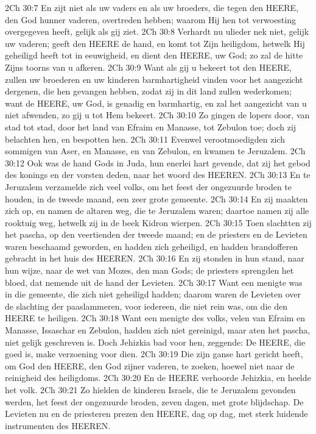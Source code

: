 2Ch 30:7  En zijt niet als uw vaders en als uw broeders, die tegen den HEERE, den God hunner vaderen, overtreden hebben; waarom Hij hen tot verwoesting overgegeven heeft, gelijk als gij ziet.
2Ch 30:8  Verhardt nu ulieder nek niet, gelijk uw vaderen; geeft den HEERE de hand, en komt tot Zijn heiligdom, hetwelk Hij geheiligd heeft tot in eeuwigheid, en dient den HEERE, uw God; zo zal de hitte Zijns toorns van u afkeren.
2Ch 30:9  Want als gij u bekeert tot den HEERE, zullen uw broederen en uw kinderen barmhartigheid vinden voor het aangezicht dergenen, die hen gevangen hebben, zodat zij in dit land zullen wederkomen; want de HEERE, uw God, is genadig en barmhartig, en zal het aangezicht van u niet afwenden, zo gij u tot Hem bekeert.
2Ch 30:10  Zo gingen de lopers door, van stad tot stad, door het land van Efraim en Manasse, tot Zebulon toe; doch zij belachten hen, en bespotten hen.
2Ch 30:11  Evenwel verootmoedigden zich sommigen van Aser, en Manasse, en van Zebulon, en kwamen te Jeruzalem.
2Ch 30:12  Ook was de hand Gods in Juda, hun enerlei hart gevende, dat zij het gebod des konings en der vorsten deden, naar het woord des HEEREN.
2Ch 30:13  En te Jeruzalem verzamelde zich veel volks, om het feest der ongezuurde broden te houden, in de tweede maand, een zeer grote gemeente.
2Ch 30:14  En zij maakten zich op, en namen de altaren weg, die te Jeruzalem waren; daartoe namen zij alle rooktuig weg, hetwelk zij in de beek Kidron wierpen.
2Ch 30:15  Toen slachtten zij het pascha, op den veertienden der tweede maand; en de priesters en de Levieten waren beschaamd geworden, en hadden zich geheiligd, en hadden brandofferen gebracht in het huis des HEEREN.
2Ch 30:16  En zij stonden in hun stand, naar hun wijze, naar de wet van Mozes, den man Gods; de priesters sprengden het bloed, dat nemende uit de hand der Levieten.
2Ch 30:17  Want een menigte was in die gemeente, die zich niet geheiligd hadden; daarom waren de Levieten over de slachting der paaslammeren, voor iedereen, die niet rein was, om die den HEERE te heiligen.
2Ch 30:18  Want een menigte des volks, velen van Efraim en Manasse, Issaschar en Zebulon, hadden zich niet gereinigd, maar aten het pascha, niet gelijk geschreven is. Doch Jehizkia bad voor hen, zeggende: De HEERE, die goed is, make verzoening voor dien.
2Ch 30:19  Die zijn ganse hart gericht heeft, om God den HEERE, den God zijner vaderen, te zoeken, hoewel niet naar de reinigheid des heiligdoms.
2Ch 30:20  En de HEERE verhoorde Jehizkia, en heelde het volk.
2Ch 30:21  Zo hielden de kinderen Israels, die te Jeruzalem gevonden werden, het feest der ongezuurde broden, zeven dagen, met grote blijdschap. De Levieten nu en de priesteren prezen den HEERE, dag op dag, met sterk luidende instrumenten des HEEREN.
